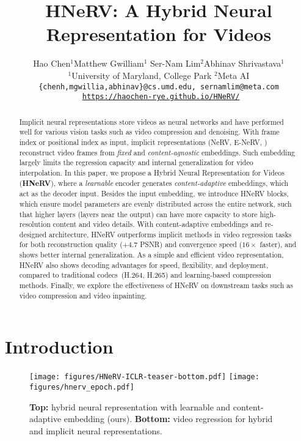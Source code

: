\documentclass[10pt,twocolumn,letterpaper]{article}
\begin{document}
\title{HNeRV: A Hybrid Neural Representation for Videos}

\author{Hao Chen$^{1}$\quad Matthew Gwilliam$^{1}$ \quad Ser-Nam Lim$^{2}$\quad Abhinav Shrivastava$^{1}$\\[0.5em]
$^{1}$University of Maryland, College Park \quad\quad $^{2}$Meta AI \quad\quad \\
{\tt\small \{chenh,mgwillia,abhinav\}@cs.umd.edu, sernamlim@meta.com} \\
{\tt\small ~\url{https://haochen-rye.github.io/HNeRV/}}
}
\maketitle

\begin{abstract}
    Implicit neural representations store videos as neural networks and have performed well for various vision tasks such as video compression and denoising. 
    With frame index or positional index as input, implicit representations (NeRV, E-NeRV, \etc) reconstruct video frames from  \textit{fixed} and \textit{content-agnostic} embeddings. 
    Such embedding largely limits the regression capacity and internal generalization for video interpolation. 
    In this paper, we propose a Hybrid Neural Representation for Videos (\textbf{HNeRV}), where a \textit{learnable} encoder generates \textit{content-adaptive} embeddings, which act as the decoder input. 
    Besides the input embedding, we introduce HNeRV blocks, which ensure model parameters are evenly distributed across the entire network, such that higher layers (layers near the output) can have more capacity to store high-resolution content and video details. 
    With content-adaptive embeddings and re-designed architecture, HNeRV outperforms implicit methods in video regression tasks for both reconstruction quality ($+4.7$ PSNR) and convergence speed ($16\times$ faster), and shows better internal generalization. 
    As a simple and efficient video representation, HNeRV also shows decoding advantages for speed, flexibility, and deployment, compared to traditional codecs~(H.264, H.265) and learning-based compression methods. 
    Finally, we explore the effectiveness of HNeRV on downstream tasks such as video compression and video inpainting.
\end{abstract}



\section{Introduction}
\begin{figure}[t!]
    \centering
    \texttt{[image: figures/HNeRV-ICLR-teaser-bottom.pdf]} 
    \texttt{[image: figures/hnerv\_epoch.pdf]}   
    \caption{
    \textbf{Top:} hybrid neural representation with learnable and content-adaptive embedding (ours).
    \textbf{Bottom:} video regression for hybrid and implicit neural representations.    
  }
    \label{fig:hnerv-teaser}
\end{figure}
\end{document}
